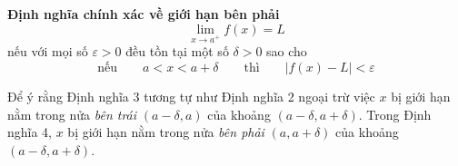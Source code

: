 \begin{minipage}[t]{0.71\textwidth}
    \begin{definitionbox}
        \hspace{0.5em}\textbf{\textsf{\color{stewartred}Định nghĩa chính xác về giới hạn bên phải}}
        \[
        \lim_{x \to a^+} f(x) = L
        \]
        \noindent nếu với mọi số $\varepsilon > 0$ đều tồn tại một số $\delta > 0$ sao cho
        \[
        \text{nếu} \qquad a < x < a + \delta \qquad \text{thì} \qquad |f(x) - L| < \varepsilon
        \]
    \end{definitionbox}

    \vspace{0.3em}
    Để ý rằng Định nghĩa 3 tương tự như Định nghĩa 2 ngoại trừ việc $x$ bị giới hạn nằm trong nửa \textit{bên trái} $(a - \delta, a)$ của khoảng $(a - \delta, a + \delta)$. Trong Định nghĩa 4, $x$ bị giới hạn nằm trong nửa \textit{bên phải} $(a, a + \delta)$ của khoảng $(a - \delta, a + \delta)$.
\end{minipage}
